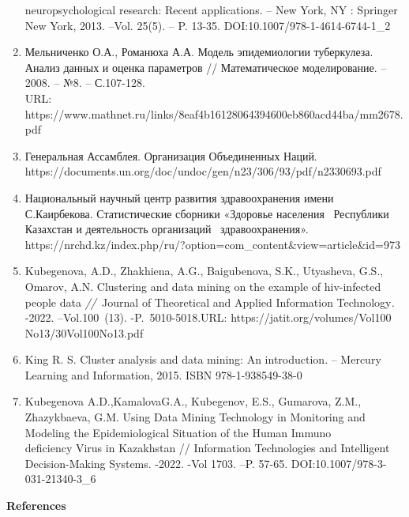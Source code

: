 \begin{noparindent}
\begin{enumerate}
  neuropsychological research: Recent applications. -- New York, NY :
  Springer New York, 2013. --Vol. 25(5). -- P. 13-35.
  DOI:10.1007/978-1-4614-6744-1\_2
\item
  Мельниченко О.А., Романюха А.А. Модель эпидемиологии туберкулеза.
  Анализ данных и оценка параметров // Математическое моделирование. --
  2008. -- №8. -- С.107-128.\\URL:
  https://www.mathnet.ru/links/8eaf4b16128064394600eb860acd44ba/mm2678.pdf
\item
  Генеральная Ассамблея. Организация Объединенных Наций.
  \\https://documents.un.org/doc/undoc/gen/n23/306/93/pdf/n2330693.pdf
\item
  Национальный научный центр развития здравоохранения имени
  С.Каирбекова. Статистические сборники «Здоровье населения~ Республики
  Казахстан и деятельность организаций~ здравоохранения».~ \\https://nrchd.kz/index.php/ru/?option=com\_content\&view=article\&id=973

\item
  Kubegenova, A.D., Zhakhiena, A.G., Baigubenova, S.K., Utyasheva, G.S.,
  Omarov, A.N. Clustering and data mining on the example of hiv-infected
  people data
  \emph{//~}Journal of Theoretical and Applied Information
  Technology\emph{.} -2022. --Vol.100~(13). -P.~5010-5018.URL:
  https://jatit.org/volumes/Vol100\\No13/30Vol100No13.pdf
\item
  King R. S. Cluster analysis and data mining: An introduction. --
  Mercury Learning and Information, 2015. ISBN 978-1-938549-38-0
\item
  Kubegenova A.D.,KamalovaG.A., Kubegenov, E.S., Gumarova, Z.M.,
  Zhazykbaeva, G.M. Using Data Mining Technology in Monitoring and
  Modeling the Epidemiological Situation of the Human Immuno\\deficiency
  Virus in Kazakhstan // Information Technologies and Intelligent
  Decision-Making Systems. -2022. -Vol 1703. --P. 57-65.
  DOI:10.1007/978-3-031-21340-3\_6
\end{enumerate}

\end{noparindent}

\begin{center}
  {\bfseries References}
  \end{center}

